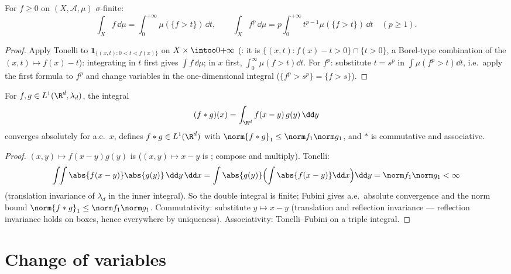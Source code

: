 \begin{proposition}\label{prop:b3:product:layercake}
For $f \geq 0$  on $(X, \mathcal A, \mu)$
$\sigma$-finite:
\[
\int_X f\,\dd\mu = \int_0^{+\infty}\mu(\{f > t\})\,\dd t,
\qquad
\int_X f^p\,\dd\mu = p\int_0^{+\infty}t^{p-1}\mu(\{f >
t\})\,\dd t \quad (p \geq 1).
\]
\end{proposition}

\begin{proof}
Apply Tonelli to $\mathbf 1_{\{(x,t) : 0 < t < f(x)\}}$ on $X
\times \intoo0{+\infty}$ (: it is $\{(x,t): f(x) - t
> 0\}\cap\{t > 0\}$, a Borel-type combination of the
 $(x,t)\mapsto f(x) - t$): integrating in $t$ first
gives $\int f\,\dd\mu$; in $x$ first, $\int_0^\infty\mu(f >
t)\dd t$. For $f^p$: substitute $t = s^p$ in $\int\mu(f^p > t)
\dd t$, i.e.\ apply the first formula to $f^p$ and change
variables in the one-dimensional integral ($\{f^p > s^p\} =
\{f > s\}$).
\end{proof}

\begin{theorem}[Convolution on $L^1$]\label{thm:b3:product:convolution}
For $f, g \in L^1(\R^d, \lambda_d)$, the integral
\[
(f * g)(x) = \int_{\R^d} f(x - y)\,g(y)\,\dd y
\]
converges absolutely for a.e.\ $x$, defines $f * g \in
L^1(\R^d)$ with $\norm{f*g}_1 \leq \norm f_1\norm g_1$, and
$*$ is commutative and associative.
\end{theorem}

\begin{proof}
$(x, y) \mapsto f(x-y)g(y)$ is  ($ (x,y)\mapsto x -
y$ is ; compose and multiply). Tonelli:
\[
\int\!\!\int \abs{f(x-y)}\abs{g(y)}\,\dd y\,\dd x
= \int\abs{g(y)}\Bigl(\int\abs{f(x - y)}\dd x\Bigr)\dd y
= \norm f_1\norm g_1 < \infty
\]
(translation invariance of $\lambda_d$ in the inner integral).
So the double integral is finite; Fubini gives a.e.\ absolute
convergence and the norm bound $\norm{f*g}_1 \leq \norm
f_1\norm g_1$. Commutativity: substitute $y \mapsto x - y$
(translation and reflection invariance --- reflection
invariance holds on boxes, hence everywhere by uniqueness).
Associativity: Tonelli--Fubini on a triple integral.
\end{proof}

\section{Change of variables}

